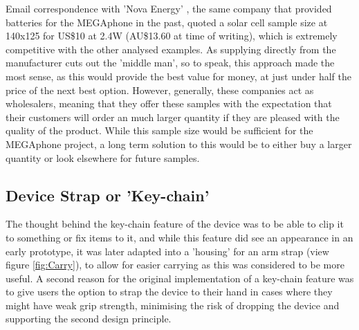 Email correspondence with 'Nova Energy' \cite{nova}, the same company that provided batteries for the MEGAphone in the past, quoted a solar cell sample size at 140x125 for US\$10 at 2.4W (AU\$13.60 at time of writing), which is extremely competitive with the other analysed examples.
As supplying directly from the manufacturer cuts out the 'middle man', so to speak, this approach made the most sense, as this would provide the best value for money, at just under half the price of the next best option.
However, generally, these companies act as wholesalers, meaning that they offer these samples with the expectation that their customers will order an much larger quantity if they are pleased with the quality of the product.
While this sample size would be sufficient for the MEGAphone project, a long term solution to this would be to either buy a larger quantity or look elsewhere for future samples.

\subsection{Device Strap or 'Key-chain'} \label{Strap}

The thought behind the key-chain feature of the device was to be able to clip it to something or fix items to it, and while this feature did see an appearance in an early prototype, it was later adapted into a 'housing' for an arm strap (view figure \ref{fig:Carry}), to allow for easier carrying as this was considered to be more useful.
A second reason for the original implementation of a key-chain feature was to give users the option to strap the device to their hand in cases where they might have weak grip strength, minimising the risk of dropping the device and supporting the second design principle.

